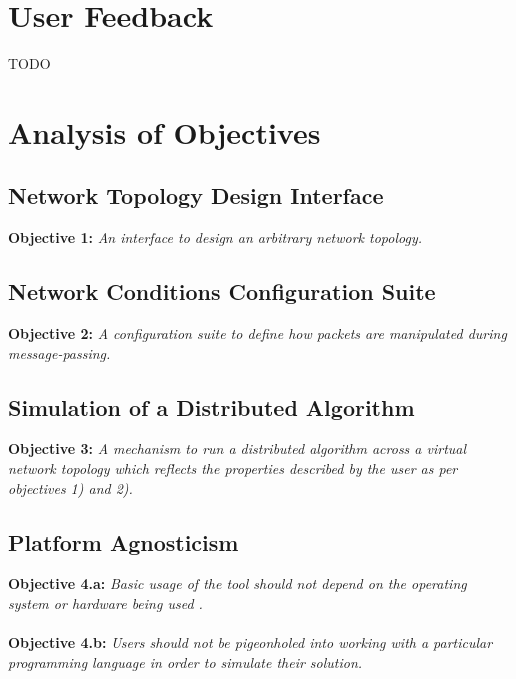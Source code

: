 \section{User Feedback}\label{section:user_feedback}

TODO


\section{Analysis of Objectives}\label{section:analysis_of_objectives}

\subsection{Network Topology Design Interface}\label{subsection:network_topology_design_interface}

\textbf{Objective 1: }\emph{An interface to design an arbitrary network topology.}

\subsection{Network Conditions Configuration Suite}\label{subsection:network_conditions_configuration_suite }

\textbf{Objective 2: }\emph{A configuration suite to define how packets are manipulated during message-passing.}

\subsection{Simulation of a Distributed Algorithm}\label{subsection:simulation_of_a_distributed_algorithm}

\textbf{Objective 3: }\emph{A mechanism to run a distributed algorithm across a virtual network topology which
reflects the
properties described by the user as per objectives 1) and 2).}

\subsection{Platform Agnosticism}\label{subsection:platform_agnosticism}

\textbf{Objective 4.a: }\emph{Basic usage of the tool should not depend on the operating system or hardware being used
.} \\ \\
\textbf{Objective 4.b: }\emph{Users should not be pigeonholed into working with a particular programming language in
order to
simulate their solution.}

